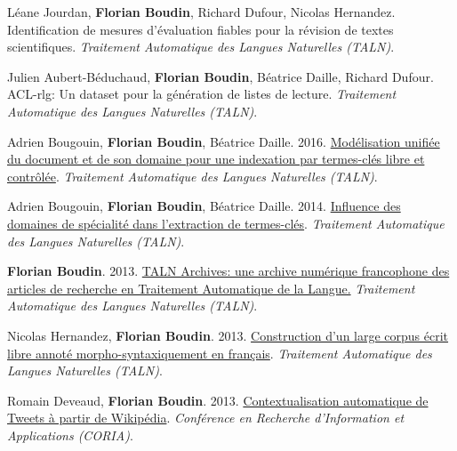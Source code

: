\item
Léane Jourdan, \textbf{Florian Boudin}, Richard Dufour, Nicolas Hernandez.
Identification de mesures d’évaluation fiables pour la révision de textes scientifiques.
\textit{Traitement Automatique des Langues Naturelles (TALN)}.
\label{jourdan-etal-2025-identification}

\item
Julien Aubert-Béduchaud, \textbf{Florian Boudin}, Béatrice Daille, Richard Dufour.
ACL-rlg: Un dataset pour la génération de listes de lecture.
\textit{Traitement Automatique des Langues Naturelles (TALN)}.
\label{aubert-etal-2025-acl-rlg}

\item 
Adrien Bougouin, \textbf{Florian Boudin}, Béatrice Daille.
2016.
\href{https://aclanthology.org/2016.jeptalnrecital-long.18.pdf}{Modélisation unifiée du document et de son domaine pour une indexation par termes-clés libre et contrôlée}.
\textit{Traitement Automatique des Langues Naturelles (TALN)}.
\label{bougouin-etal-2016-modelisation}

\item 
Adrien Bougouin, \textbf{Florian Boudin}, Béatrice Daille.
2014.
\href{https://aclanthology.org/F14-1002.pdf}{Influence des domaines de spécialité dans l’extraction de termes-clés}.
\textit{Traitement Automatique des Langues Naturelles (TALN)}.
\label{bougouin-etal-2014-influence}

\item 
\textbf{Florian Boudin}.
2013.
\href{https://aclanthology.org/F13-2001.pdf}{TALN Archives: une archive numérique francophone des articles de recherche en Traitement Automatique de la Langue.}
\textit{Traitement Automatique des Langues Naturelles (TALN)}.
\label{boudin-2013-taln}

\item 
Nicolas Hernandez, \textbf{Florian Boudin}.
2013.
\href{https://aclanthology.org/F13-1012.pdf}{Construction d’un large corpus écrit libre annoté morpho-syntaxiquement en français}.
\textit{Traitement Automatique des Langues Naturelles (TALN)}.
\label{hernandez-boudin-2013-construction}

\item 
Romain Deveaud, \textbf{Florian Boudin}.
2013.
\href{https://asso-aria.org/coria/2013/coria/coria2013_23.pdf}{Contextualisation automatique de Tweets à partir de Wikipédia}.
\textit{Conférence en Recherche d’Information et Applications (CORIA)}.
\label{deveaud-boudin-2013-contextualisation}

